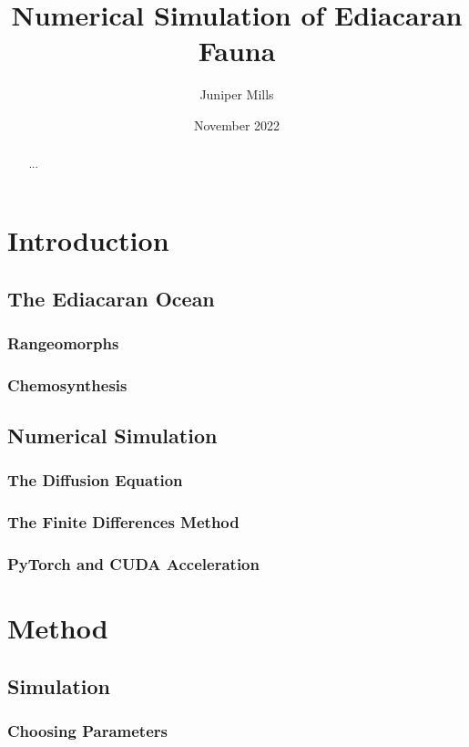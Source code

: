 \documentclass[draft]{article}
\begin{document}
\title{Numerical Simulation of Ediacaran Fauna}
\author{Juniper Mills}
\date{November 2022}
\maketitle

\begin{abstract}
    ...
\end{abstract}

\tableofcontents

\section{Introduction}
\subsection{The Ediacaran Ocean}
\cite{mcnichol2018}
\subsubsection{Rangeomorphs}
\subsubsection{Chemosynthesis}
\subsection{Numerical Simulation}
\subsubsection{The Diffusion Equation}
\subsubsection{The Finite Differences Method}
\subsubsection{PyTorch and CUDA Acceleration}
\section{Method}
\subsection{Simulation}
\subsubsection{Choosing Parameters}
\end{document}
